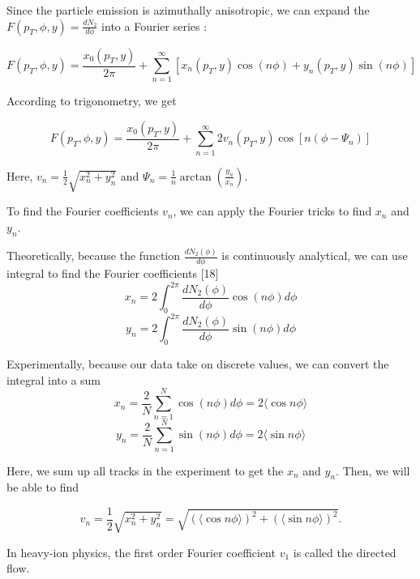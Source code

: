 Since the particle emission is azimuthally anisotropic, we can expand the $F(p_T,\phi,y) = \frac{dN_2}{d\phi}$ into a Fourier series \cite{EllipticFlow}:


\begin{equation}
F(p_T,\phi,y) = \frac{x_0(p_T,y)}{2\pi}  + \sum_{n=1}^{\infty}[x_n(p_T,y)\cos(n\phi)+y_n(p_T,y)\sin(n\phi)] 
\end{equation}

According to trigonometry, we get

\begin{equation}
F(p_T,\phi,y)  = \frac{x_0(p_T,y)}{2\pi} + \sum_{n=1}^{\infty}2v_n(p_T,y)\cos[n(\phi - \Psi_{n})]
\end{equation}

Here, $v_n = \frac{1}{2} \sqrt{x_n^2 + y_n^2}$ and $\Psi_{n} =\frac{1}{n} \arctan(\frac{y_n}{x_n})$. 

To find the Fourier coefficients $v_n$, we can apply the Fourier tricks to find $x_n$ and $y_n$.


Theoretically, because the function $\frac{dN_2(\phi)}{d\phi}$ is continuously analytical, we can use integral to find the Fourier coefficients [18] 
\begin{equation}
x_n =2\int_{0}^{2\pi} \frac{dN_2(\phi)}{d\phi}\cos(n\phi)d\phi 
\end{equation}
\begin{equation}
y_n =2\int_{0}^{2\pi} \frac{dN_2(\phi)}{d\phi}\sin(n\phi)d\phi 
\end{equation}

Experimentally, because our data take on discrete values, we can convert the integral into a sum 
\begin{equation}
x_n =\frac{2}{N}\sum_{n=1}^{N} \cos(n\phi)d\phi = 2\langle \cos n\phi \rangle
\end{equation}
\begin{equation}
y_n =\frac{2}{N}\sum_{n=1}^{N} \sin(n\phi)d\phi = 2\langle \sin n\phi \rangle
\end{equation}

Here, we sum up all tracks in the experiment to get the $x_n$ and $y_n$. Then, we will be able to find 

\begin{equation}
v_n = \frac{1}{2} \sqrt{x_n^2 + y_n^2} = \sqrt{(\langle \cos n\phi \rangle)^2+(\langle \sin n\phi \rangle)^2}. 
\end{equation}




In heavy-ion physics, the first order Fourier coefficient $v_1$ is called the directed flow. 

